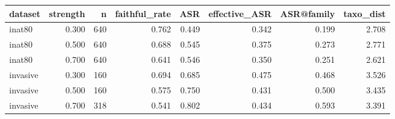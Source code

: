 \begin{tabular}{lrrrrrrr}
\toprule
dataset & strength & n & faithful_rate & ASR & effective_ASR & ASR@family & taxo_dist \\
\midrule
inat80 & 0.300 & 640 & 0.762 & 0.449 & 0.342 & 0.199 & 2.708 \\
inat80 & 0.500 & 640 & 0.688 & 0.545 & 0.375 & 0.273 & 2.771 \\
inat80 & 0.700 & 640 & 0.641 & 0.546 & 0.350 & 0.251 & 2.621 \\
invasive & 0.300 & 160 & 0.694 & 0.685 & 0.475 & 0.468 & 3.526 \\
invasive & 0.500 & 160 & 0.575 & 0.750 & 0.431 & 0.500 & 3.435 \\
invasive & 0.700 & 318 & 0.541 & 0.802 & 0.434 & 0.593 & 3.391 \\
\bottomrule
\end{tabular}
